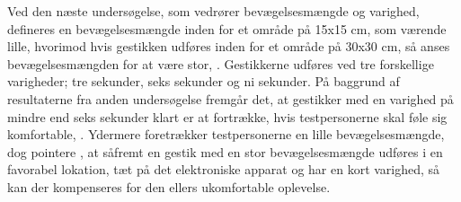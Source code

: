 Ved den næste undersøgelse, som vedrører bevægelsesmængde og varighed, defineres en bevægelsesmængde inden for et område på 15x15 cm, som værende lille, hvorimod hvis gestikken udføres inden for et område på 30x30 cm, så anses bevægelsesmængden for at være stor, \parencite[s. 198]{PDF:AreYouComfortableDoingThat}. Gestikkerne udføres ved tre forskellige varigheder; tre sekunder, seks sekunder og ni sekunder. På baggrund af resultaterne fra anden undersøgelse fremgår det, at gestikker med en varighed på mindre end seks sekunder klart er at fortrække, hvis testpersonerne skal føle sig komfortable, \parencite[s. 199]{PDF:AreYouComfortableDoingThat}. Ydermere foretrækker testpersonerne en lille bevægelsesmængde, dog pointere \textcite[s. 199]{PDF:AreYouComfortableDoingThat}, at såfremt en gestik med en stor bevægelsesmængde udføres i en favorabel lokation, tæt på det elektroniske apparat og har en kort varighed, så kan der kompenseres for den ellers ukomfortable oplevelse. 

